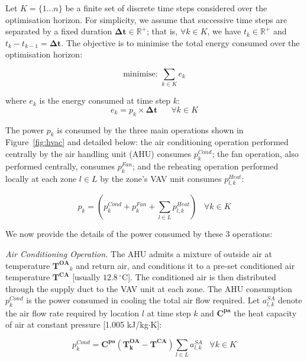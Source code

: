 Let $K = \{1 \ldots n\}$ be a finite set of discrete time steps considered over the optimisation horizon. For simplicity, we assume
that successive time steps are separated by a fixed duration $\bm{\Delta t} \in \mathbb{R}^+$; that is, $\forall k\in K$, we have $t_k \in
\mathbb{R}^+$ and $t_{k} - t_{k-1} = \bm{\Delta t}$. The objective is to minimise the total energy consumed over the optimisation horizon:

\begin{equation} \label{eq:objective}
\mbox{minimise: } \sum_{k\in K} e_{k}
\end{equation}

\noindent where $e_k$ is the energy consumed at time step $k$: 
\begin{equation} \label{eq:e_total} 
e_{k} = p_{k} \times \bm{\Delta t} \hspace{20pt} \forall k \in K 
\end{equation}

\noindent The power $p_{k}$ is consumed by the three main operations shown in Figure~\ref{fig:hvac} and detailed below: the
  air conditioning operation performed centrally by the air handling unit (AHU) consumes $p_{k}^{Cond}$; the fan operation, also
  performed centrally, consumes $p_{k}^{Fan}$; and the reheating operation performed locally at each zone $l\in L$ by the zone's VAV
  unit consumes $p_{l,k}^{Heat}$:
	
\begin{equation} \label{eq:p_total} 
p_{k} = \left( p_{k}^{Cond} + p_{k}^{Fan} + \sum\limits_{l \in L} p_{l,k}^{Heat}\right) \hspace{10pt} \forall k \in K 
\end{equation}

We now provide the details of the power consumed by these 3 operations:

\noindent\emph{Air Conditioning Operation.} The AHU admits a mixture of outside air at temperature $\bm{T^{OA}}_k$ and
return air, and conditions it to a pre-set conditioned air temperature $\bm{T^{CA}}$ [usually $12.8\,^{\circ}\mathrm{C}$]. The conditioned air is then distributed through the supply duct to the VAV unit at each zone. The AHU consumption $p_{k}^{Cond}$ is the power consumed in cooling the total air flow required.  Let $a^{SA}_{l,k}$ denote the air flow rate required by location $l$ at time step $k$ and $\bm{C^{pa}}$ the heat capacity of air at constant pressure [1.005 kJ/kg$\cdot$K]: 

\begin{equation} \label{eq:p_cond}
p_{k}^{Cond} = \bm{C^{pa}}\left(\bm{T^{OA}_{k}} - \bm{T^{CA}}\right) \sum\limits_{l \in L} a_{l,k}^{SA} \hspace{10pt} \forall k \in K 
\end{equation}

